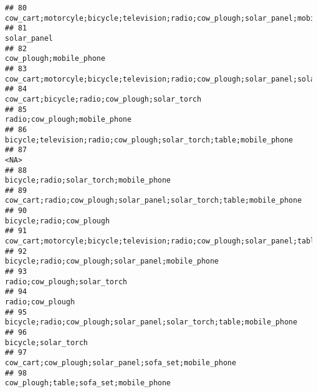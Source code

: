 \documentclass[
]{article}
\begin{document}
\begin{verbatim}
## 80                                                           cow_cart;motorcyle;bicycle;television;radio;cow_plough;solar_panel;mobile_phone
## 81                                                                                                                               solar_panel
## 82                                                                                                                   cow_plough;mobile_phone
## 83                                               cow_cart;motorcyle;bicycle;television;radio;cow_plough;solar_panel;solar_torch;mobile_phone
## 84                                                                                             cow_cart;bicycle;radio;cow_plough;solar_torch
## 85                                                                                                             radio;cow_plough;mobile_phone
## 86                                                                        bicycle;television;radio;cow_plough;solar_torch;table;mobile_phone
## 87                                                                                                                                      <NA>
## 88                                                                                                    bicycle;radio;solar_torch;mobile_phone
## 89                                                                      cow_cart;radio;cow_plough;solar_panel;solar_torch;table;mobile_phone
## 90                                                                                                                  bicycle;radio;cow_plough
## 91                                                     cow_cart;motorcyle;bicycle;television;radio;cow_plough;solar_panel;table;mobile_phone
## 92                                                                                         bicycle;radio;cow_plough;solar_panel;mobile_phone
## 93                                                                                                              radio;cow_plough;solar_torch
## 94                                                                                                                          radio;cow_plough
## 95                                                                       bicycle;radio;cow_plough;solar_panel;solar_torch;table;mobile_phone
## 96                                                                                                                       bicycle;solar_torch
## 97                                                                                     cow_cart;cow_plough;solar_panel;sofa_set;mobile_phone
## 98                                                                                                    cow_plough;table;sofa_set;mobile_phone

\end{verbatim}
\end{document}
